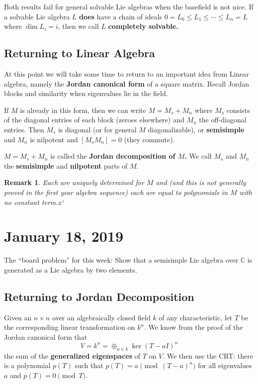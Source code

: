 \documentclass[12pt]{article}
\theoremstyle{nonumberbreak}
\theoremstyle{changebreak}
\theoremstyle{nonumberbreak}
\theoremstyle{change}
\newtheorem{rmk}[thm]{Remark}
\newcommand*{\C}{
\mathbb{C}
}
\begin{document}
Both results fail for general solvable Lie algebras when the basefield is not nice. If a solvable Lie algebra $L$ 
\textbf{does} have a chain of ideals $0=L_0\le L_1\le\cdots\le L_n=L$ where $\dim L_i=i$, then we call $L$ \textbf{completely solvable.}

\subsection{Returning to Linear Algebra}
At this point we will take some time to return to an important idea from Linear algebra, namely the \textbf{Jordan canonical form}
of a square matrix. Recall Jordan blocks and similarity when eigenvalues lie in the field.

If $M$ is already in this form, then we can write $M=M_s+M_n$ where $M_s$ consists of the diagonal entries of each
block (zeroes elsewhere) and $M_n$ the off-diagonal entries. Then $M_s$ is diagonal (or for general $M$
diagonalizable), or \textbf{semisimple} and $M_n$ is nilpotent and $[M_sM_n]=0$ (they commute).

\begin{defn}
	$M=M_s+M_n$ is called the \textbf{Jordan decomposition of $M$.} We call $M_s$ and $M_n$ the \textbf{semisimple} 
	and \textbf{nilpotent} parts of $M$.
\end{defn}
\begin{rmk}
	Each are uniquely determined for $M$ and (and this is not generally proved in the first year 
	algebra sequence) each are equal to polynomials in $M$ with no constant term.x`
\end{rmk}

\section{January 18, 2019}
\begin{prob}
	The ``board problem'' for this week: Show that a semisimple Lie algebra over $\C$ is generated as a Lie
	algebra by two elements.
\end{prob}

\subsection{Returning to Jordan Decomposition}
Given an $n\times n$ over an algebraically closed field $k$ of any characteristic, let $T$ be the corresponding linear
transformation on $k^n$. We know from the proof of the Jordan canonical form that 
\[V=k^n=\oplus_{a\in k}\ker(T-aI)^n\]
the sum of the \textbf{generalized eigenspaces} of $T$ on $V$. We then use the CRT:
there is a polynomial $p(T)$ such that $p(T)=a\pmod (T-a)^n$ for all eigenvalues $a$ and
$p(T)=0\pmod{T}$.
\end{document}
